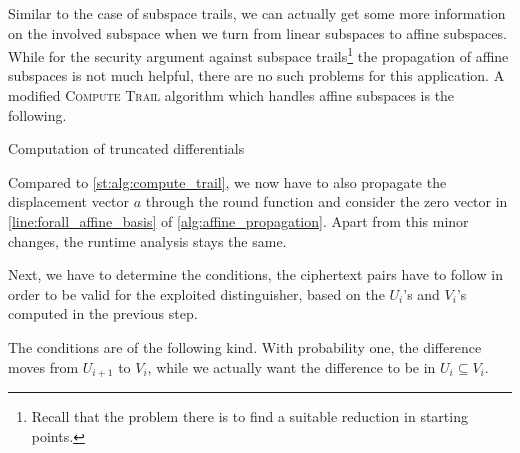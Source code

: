 Similar to the case of subspace trails, we can actually get some more information on the involved subspace when we turn from linear subspaces to affine subspaces.
While for the security argument against subspace trails\footnote{%
    Recall that the problem there is to find a suitable reduction in starting points.
} the propagation of affine subspaces is not much helpful, there are no such problems for this application.
A modified \textsc{Compute Trail} algorithm which handles affine subspaces is the following.
\begin{algorithm}
    \caption{Computation of truncated differentials}\label{alg:affine_propagation}
\begin{algorithmic}[1]
    \Statex{}
        \State{}
    \EndIf{}
    \label{line:forall_affine_basis}
        \EndFor{}
    \EndFor{}
    \State{}
    \EndFunction{}
\end{algorithmic}
\end{algorithm}

Compared to \cref{st:alg:compute_trail}, we now have to also propagate the displacement vector $a$ through the round function and consider the zero vector in \cref{line:forall_affine_basis} of \cref{alg:affine_propagation}.
Apart from this minor changes, the runtime analysis stays the same.

Next, we have to determine the conditions, the ciphertext pairs have to follow in order to be valid for the exploited distinguisher, based on the $U_i$'s and $V_i$'s computed in the previous step.

The conditions are of the following kind.
With probability one, the difference moves from $U_{i+1}$ to $V_i$, while we actually want the difference to be in $U_{i} \subseteq V_{i}$.

